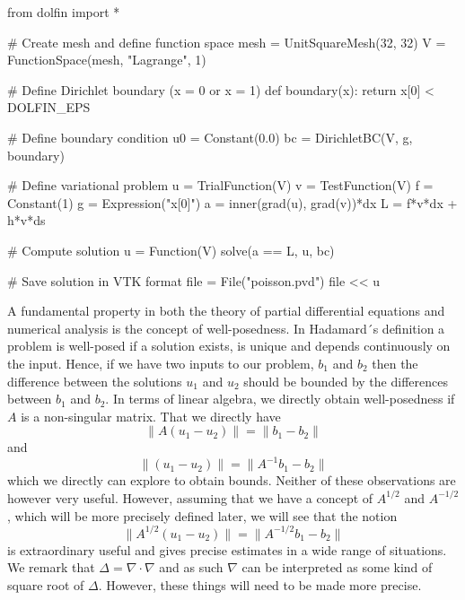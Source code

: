 \begin{python}
from dolfin import *

# Create mesh and define function space
mesh = UnitSquareMesh(32, 32)
V = FunctionSpace(mesh, "Lagrange", 1)

# Define Dirichlet boundary (x = 0 or x = 1)
def boundary(x): return x[0] < DOLFIN_EPS 

# Define boundary condition
u0 = Constant(0.0)
bc = DirichletBC(V, g, boundary)

# Define variational problem
u = TrialFunction(V)
v = TestFunction(V)
f = Constant(1)
g = Expression("x[0]")
a = inner(grad(u), grad(v))*dx
L = f*v*dx + h*v*ds

# Compute solution
u = Function(V)
solve(a == L, u, bc)

# Save solution in VTK format
file = File("poisson.pvd")
file << u
\end{python}



A fundamental property in both the theory of partial differential equations and numerical analysis is the
concept of well-posedness. In Hadamard´s definition a problem is well-posed if a solution exists, is unique
and depends continuously on the input. Hence, if we have two inputs to our problem, $b_1$ and $b_2$ 
then the difference between the solutions $u_1$ and $u_2$ should be bounded by the differences
between $b_1$ and $b_2$. In terms of linear algebra, we directly obtain well-posedness if
$A$ is a non-singular matrix. That we directly have 
\[
\|A(u_1 - u_2) \| = \|b_1 - b_2\|     
\]
and 
\[
\|(u_1 - u_2) \| = \|A^{-1}b_1 - b_2\|     
\]
which we directly can explore to obtain bounds. Neither of these observations are however
very useful. However, assuming that we have a concept of 
$A^{1/2}$ and $A^{-1/2}$, which will be more precisely defined later, 
we will see that the notion 
\[
\|A^{1/2}(u_1 - u_2) \| = \|A^{-1/2}b_1 - b_2\|     
\]
is extraordinary useful and gives precise estimates in a wide range of situations.  
We remark that $\Delta=\nabla\cdot\nabla$ and as such $\nabla$ can be interpreted
as some kind of square root of $\Delta$. However, these things will need to be made
more precise.  






